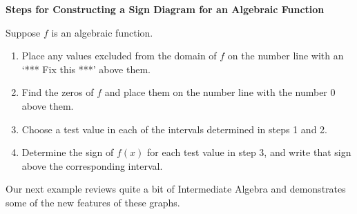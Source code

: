 \documentclass[12pt]{ximera}
\begin{document}
\smallskip

\centerline{\textbf{Steps for Constructing a Sign Diagram for an Algebraic Function}} 

\smallskip

\hspace{.17in} Suppose $f$ is an algebraic function.

\begin{enumerate}

\item  Place any values excluded from the domain of  $f$ on the number line with an `*** Fix this ***' above them.

\item  Find the zeros of $f$ and place them on the number line with the number $0$ above them.

\item  Choose a test value in each of the intervals determined in steps 1 and 2.

\item  Determine the sign of $f(x)$ for each test value in step 3, and write that sign above the corresponding interval.

\end{enumerate}


\medskip 

Our next example reviews quite a bit of Intermediate Algebra and demonstrates some of the new features of these graphs.
\end{document}
